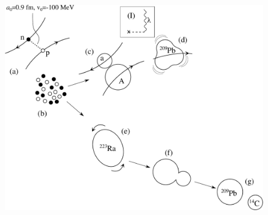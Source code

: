 \begin{figure}
	\centerline {
		\includegraphics*[width=15cm]{introduccion/figs/figpreface2-v2}
	}

\end{figure}
